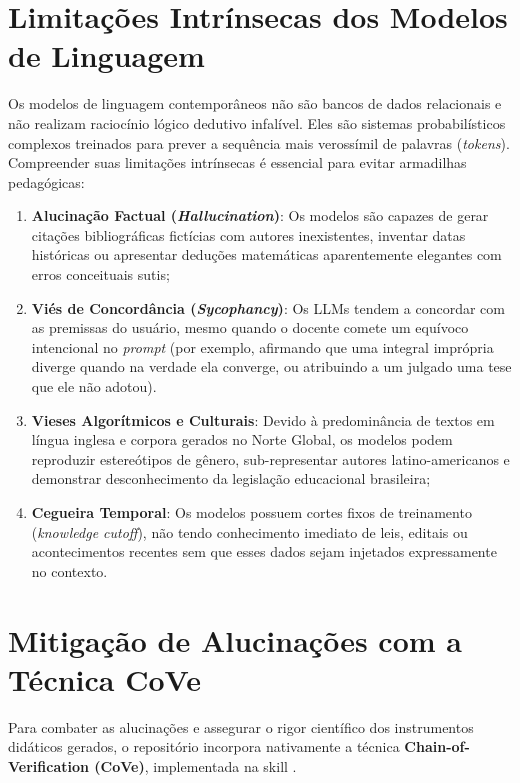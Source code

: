 \section{Limita{\c c}{\~o}es Intr{\'i}nsecas dos Modelos de Linguagem}

Os modelos de linguagem contempor{\^a}neos n{\~a}o s{\~a}o bancos de dados relacionais e n{\~a}o realizam racioc{\'i}nio l{\'o}gico dedutivo infal{\'i}vel. Eles s{\~a}o sistemas probabil{\'i}sticos complexos treinados para prever a sequ{\^e}ncia mais veross{\'i}mil de palavras (\emph{tokens}). Compreender suas limita{\c c}{\~o}es intr{\'i}nsecas {\'e} essencial para evitar armadilhas pedag{\'o}gicas:

\begin{enumerate}
  \item \textbf{Alucina{\c c}{\~a}o Factual (\emph{Hallucination})}: Os modelos s{\~a}o capazes de gerar cita{\c c}{\~o}es bibliogr{\'a}ficas fict{\'i}cias com autores inexistentes, inventar datas hist{\'o}ricas ou apresentar dedu{\c c}{\~o}es matem{\'a}ticas aparentemente elegantes com erros conceituais sutis;
  \item \textbf{Vi{\'e}s de Concord{\^a}ncia (\emph{Sycophancy})}: Os LLMs tendem a concordar com as premissas do usu{\'a}rio, mesmo quando o docente comete um equ{\'i}voco intencional no \emph{prompt} (por exemplo, afirmando que uma integral impr{\'o}pria diverge quando na verdade ela converge, ou atribuindo a um julgado uma tese que ele n{\~a}o adotou).
  \item \textbf{Vieses Algor{\'i}tmicos e Culturais}: Devido {\`a} predomin{\^a}ncia de textos em l{\'i}ngua inglesa e corpora gerados no Norte Global, os modelos podem reproduzir estere{\'o}tipos de g{\^e}nero, sub-representar autores latino-americanos e demonstrar desconhecimento da legisla{\c c}{\~a}o educacional brasileira;
  \item \textbf{Cegueira Temporal}: Os modelos possuem cortes fixos de treinamento (\emph{knowledge cutoff}), n{\~a}o tendo conhecimento imediato de leis, editais ou acontecimentos recentes sem que esses dados sejam injetados expressamente no contexto.
\end{enumerate}

\section{Mitiga{\c c}{\~a}o de Alucina{\c c}{\~o}es com a T{\'e}cnica CoVe}

Para combater as alucina{\c c}{\~o}es e assegurar o rigor cient{\'i}fico dos instrumentos did{\'a}ticos gerados, o reposit{\'o}rio incorpora nativamente a t{\'e}cnica \textbf{Chain-of-Verification (CoVe)}, implementada na skill .

